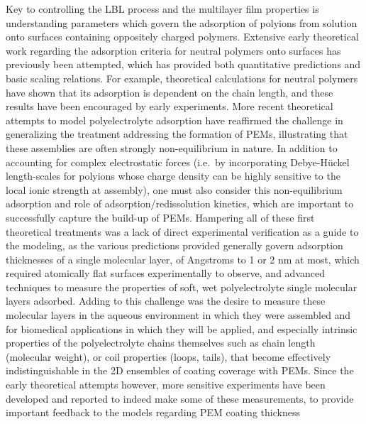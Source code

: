 \documentclass[twoside,twocolumn,9pt]{article}
\begin{document}
Key to controlling the LBL process and the multilayer film properties is understanding parameters which govern the adsorption of polyions from solution onto surfaces containing oppositely charged polymers.\cite{Schonhoff2003}  
Extensive early theoretical work regarding the adsorption criteria for neutral polymers onto surfaces has previously been attempted, which has provided both quantitative predictions\cite{Fleer1982,Baumgartner1991} and basic scaling relations.\cite{DeGennes1976,Alexander1977}  
For example, theoretical calculations for neutral polymers have shown that its adsorption is dependent on the chain length,\cite{Stuart1980} and these results have been encouraged by early experiments.\cite{Stuart1980,Felter1970}  
More recent theoretical attempts to model polyelectrolyte adsorption have reaffirmed the challenge in generalizing the treatment addressing the formation of PEMs,\cite{Szilagyi2014} illustrating that these assemblies are often strongly non-equilibrium in nature.  In addition to accounting for complex electrostatic forces (i.e.\ by incorporating Debye-H\"uckel length-scales for polyions whose charge density can be highly sensitive to the local ionic strength at assembly),\cite{Chatellier1996} one must also consider this non-equilibrium adsorption and role of adsorption/redissolution kinetics, which are important to successfully capture the build-up of PEMs.\cite{Kovacevic2002} 
Hampering all of these first theoretical treatments was a lack of direct experimental verification as a guide to the modeling, as the various predictions provided generally govern adsorption thicknesses of a single molecular layer, of Angstroms to 1 or 2 nm at most, which required atomically flat surfaces experimentally to observe, and advanced techniques to measure the properties of soft, wet polyelectrolyte single molecular layers adsorbed.  Adding to this challenge was the desire to measure these molecular layers in the aqueous environment in which they were assembled and for biomedical applications in which they will be applied, and especially intrinsic properties of the polyelectrolyte chains themselves such as chain length (molecular weight), or coil properties (loops, tails), that become effectively indistinguishable in the 2D ensembles of coating coverage with PEMs.   Since the early theoretical attempts however, more sensitive experiments have been developed and reported to indeed make some of these measurements, to provide important feedback to the models regarding PEM coating thickness 
\end{document}
